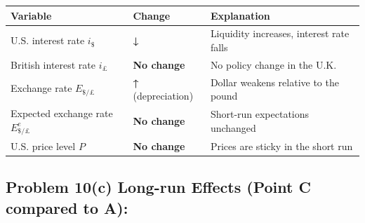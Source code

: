 \documentclass[
]{article}
\begin{document}
\begin{longtable}[]{@{}
  >{\raggedright\arraybackslash}p{}
  >{\raggedright\arraybackslash}p{}
  >{\raggedright\arraybackslash}p{}@{}}
\toprule\noalign{}
\begin{minipage}[b]{\linewidth}\raggedright
Variable
\end{minipage} & \begin{minipage}[b]{\linewidth}\raggedright
Change
\end{minipage} & \begin{minipage}[b]{\linewidth}\raggedright
Explanation
\end{minipage} \\
\midrule\noalign{}
\endhead
\bottomrule\noalign{}
\endlastfoot
U.S. interest rate \(i_{\$}\) & \textbf{↓} & Liquidity increases,
interest rate falls \\
British interest rate \(i_{£}\) & \textbf{No change} & No policy change
in the U.K. \\
Exchange rate \(E_{\$/£}\) & \textbf{↑} (depreciation) & Dollar weakens
relative to the pound \\
Expected exchange rate \(E^e_{\$/£}\) & \textbf{No change} & Short-run
expectations unchanged \\
U.S. price level \(P\) & \textbf{No change} & Prices are sticky in the
short run \\
\end{longtable}

\subsection{Problem 10(c) Long-run Effects (Point C compared to
A):}\label{problem-10c-long-run-effects-point-c-compared-to-a}
\end{document}
